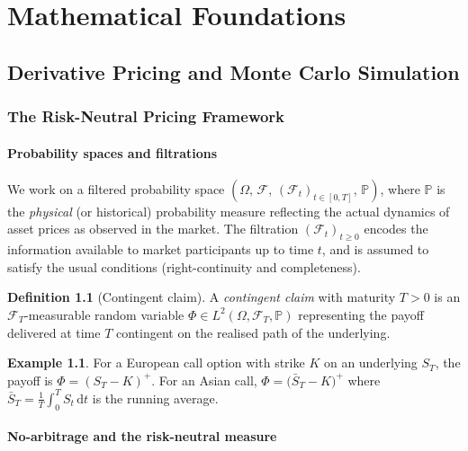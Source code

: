 \documentclass[12pt, a4paper]{report}
\theoremstyle{definition}
\newtheorem{definition}{Definition}[chapter]
\newtheorem{example}{Example}[chapter]
\newcommand{\F}{\mathcal{F}}
\newcommand{\dd}{\,\mathrm{d}}
\begin{document}
\part{Mathematical Foundations}

\chapter{Derivative Pricing and Monte Carlo Simulation}
\label{ch:pricing-mc}

\section{The Risk-Neutral Pricing Framework}

\subsection{Probability spaces and filtrations}

We work on a filtered probability space
$(\Omega,\,\mathcal{F},\,(\mathcal{F}_t)_{t \in [0,T]},\,\mathbb{P})$,
where $\mathbb{P}$ is the \emph{physical} (or historical) probability
measure reflecting the actual dynamics of asset prices as observed in the
market.  The filtration $(\F_t)_{t \geq 0}$ encodes the information
available to market participants up to time $t$, and is assumed to
satisfy the usual conditions (right-continuity and completeness).

\begin{definition}[Contingent claim]
A \emph{contingent claim} with maturity $T > 0$ is an $\F_T$-measurable
random variable $\Phi \in L^2(\Omega, \F_T, \mathbb{P})$ representing
the payoff delivered at time $T$ contingent on the realised path of the
underlying.
\end{definition}

\begin{example}
For a European call option with strike $K$ on an underlying $S_T$, the
payoff is $\Phi = (S_T - K)^+$.  For an Asian call,
$\Phi = \bigl(\bar{S}_T - K\bigr)^+$ where
$\bar{S}_T = \frac{1}{T}\int_0^T S_t \dd t$ is the running average.
\end{example}

\subsection{No-arbitrage and the risk-neutral measure}
\end{document}
